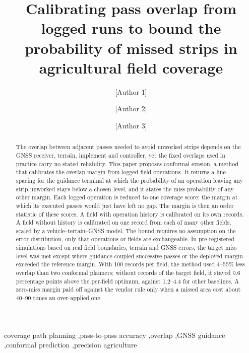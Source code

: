 \documentclass[preprint,12pt,authoryear]{elsarticle}
\begin{document}
\begin{frontmatter}
\title{Calibrating pass overlap from logged runs to bound the probability of missed strips in agricultural field coverage}
\author[a]{[Author 1]}
\author[b]{[Author 2]}
\author[a]{[Author 3]}

\begin{abstract}
The overlap between adjacent passes needed to avoid unworked strips depends on the GNSS receiver, terrain, implement and controller, yet the fixed overlaps used in practice carry no stated reliability. This paper proposes conformal erosion, a method that calibrates the overlap margin from logged field operations. It returns a line spacing for the guidance terminal at which the probability of an operation leaving any strip unworked stays below a chosen level, and it states the miss probability of any other margin. Each logged operation is reduced to one coverage score: the margin at which its executed passes would just have left no gap. The margin is then an order statistic of these scores. A field with operation history is calibrated on its own records. A field without history is calibrated on one record from each of many other fields, scaled by a vehicle--terrain--GNSS model. The bound requires no assumption on the error distribution, only that operations or fields are exchangeable. In pre-registered simulations based on real field boundaries, terrain and GNSS errors, the target miss level was met except where guidance coupled successive passes or the deployed margin exceeded the reference margin. With 100 records per field, the method used 4--55\% less overlap than two conformal planners; without records of the target field, it stayed 0.6 percentage points above the per-field optimum, against 1.2--4.4 for other baselines. A zero-miss margin paid off against the vendor rule only when a missed area cost about 40--90 times an over-applied one.
\end{abstract}

\begin{keyword}
coverage path planning \sep pass-to-pass accuracy \sep overlap \sep GNSS guidance \sep conformal prediction \sep precision agriculture
\end{keyword}
\end{frontmatter}
\end{document}
